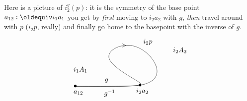 Here is a picture of $i_2^g(p)$: it is the symmetry of the base point $a_{12}\defequi i_1a_1$ you get by \emph{first} moving to $i_2a_2$ with $g$, \emph{then} travel around with $p$ ($i_2p$, really) and finally go home to the basepoint with the inverse of $g$.

$$
\xy (-20,20)*+{};(-20,20)*+{}
**\crv{(15,20)&(18,20)&(-10,35)&(10,45)&(25,30)&(20,19)&(0,20)}
?(0)*{} *!LD!/^-20pt/{i_1A_1}
?(.45)*{} *!LD!/^2pt/{>}
?(.95)*{} *!LD!/^-15pt/{g^{-1}}
?(.03)*{} *!LD!/^-5pt/{g}
?(.55)*{} *!LD!/^-7pt/{i_2p}
?(.65)*{} *!LD!/^-30pt/{i_2A_2}
?(.87)*{} *!LD!/^-12pt/{i_2a_2}
?(.86)*{} *!LD!/^-2pt/{\bullet}
?(1)*{} *!LD!/^-2pt/{\bullet}
?(1)*{} *!LD!/^-12pt/{a_{12}}
\endxy
$$


